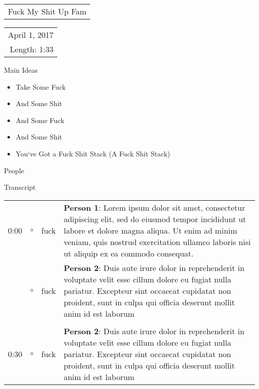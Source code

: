 \documentclass{article}
\begin{document}
\noindent\begin{tabular}{l}
{\fontsize{40}{48} \selectfont Fuck My Shit Up Fam}
\end{tabular}
\hfill
\fontsize{17.28}{17}\selectfont
\begin{tabular}{ r}
	April 1, 2017\\
	Length: 1:33
\end{tabular}

\vspace{1em}

{\Huge Main Ideas}
\begin{itemize}
	\item[] Take Some Fuck
	\item[] And Some Shit
	\item[]	And Some Fuck
	\item[]	And Some Shit
	\item[]	You`ve Got a Fuck Shit Stack (A Fuck Shit Stack)
\end{itemize}

{\Huge People}

\newpage

{\Huge Transcript}
\vspace{1em}

\begin{tabular} {l c c l}
0:00 & $\circ$ & fuck & \begin{minipage}{6.2in}\textbf{Person 1}: Lorem ipsum dolor sit amet, consectetur adipiscing elit, sed do eiusmod tempor incididunt ut labore et dolore magna aliqua. Ut enim ad minim veniam, quis nostrud exercitation ullamco laboris nisi ut aliquip ex ea commodo consequat.\end{minipage} \\[1cm]
     & $\circ$ & fuck & \begin{minipage}{6.2in}\textbf{Person 2}: Duis aute irure dolor in reprehenderit in voluptate velit esse cillum dolore eu fugiat nulla pariatur. Excepteur sint occaecat cupidatat non proident, sunt in culpa qui officia deserunt mollit anim id est laborum\end{minipage} \\[1.5cm]
	\hline
 & & & \\
0:30   & $\circ$ & fuck & \begin{minipage}{6.2in}\textbf{Person 2}: Duis aute irure dolor in reprehenderit in voluptate velit esse cillum dolore eu fugiat nulla pariatur. Excepteur sint occaecat cupidatat non proident, sunt in culpa qui officia deserunt mollit anim id est laborum\end{minipage}

\end{tabular}
\end{document}
